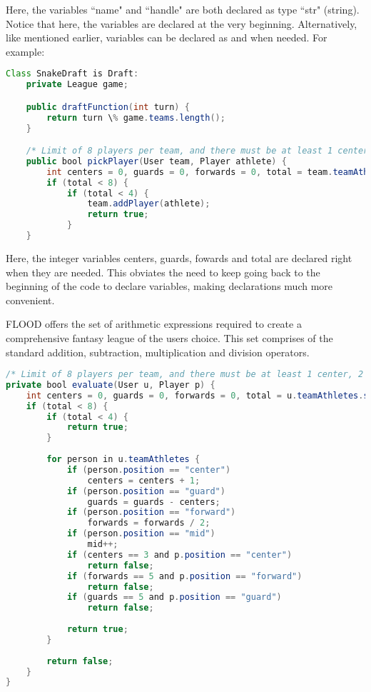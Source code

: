 \documentclass[12pt]{report}
\begin{document}
\begin{doublespace}
Here, the variables ``name" and ``handle" are both declared as type ``str" (string). Notice that here, the variables are declared at the very beginning.  Alternatively, like mentioned earlier, variables can be declared as and when needed. For example:
\end{doublespace}

\begin{lstlisting}[language=Java,label=some-code,caption=SnakeDraft.fld]
Class SnakeDraft is Draft:
	private League game;

	public draftFunction(int turn) {
		return turn \% game.teams.length();
	}

	/* Limit of 8 players per team, and there must be at least 1 center, 2 guards and 2 forwards per team. */
	public bool pickPlayer(User team, Player athlete) {
		int centers = 0, guards = 0, forwards = 0, total = team.teamAthletes.size();
		if (total < 8) {
			if (total < 4) {
				team.addPlayer(athlete);
				return true;
			}
	}
\end{lstlisting}

\begin{doublespace}
Here, the integer variables centers, guards, fowards and total are declared right when they are needed. This obviates the need to keep going back to the beginning of the code to declare variables, making declarations much more convenient.

FLOOD offers the set of arithmetic expressions required to create a comprehensive fantasy league of the users choice. This set comprises of the standard  addition, subtraction, multiplication and division operators. 
\end{doublespace}

\begin{lstlisting}[language=Java,label=some-code,caption=SnakeDraft.fld]
/* Limit of 8 players per team, and there must be at least 1 center, 2 guards and 2 forwards per team. */
private bool evaluate(User u, Player p) {
	int centers = 0, guards = 0, forwards = 0, total = u.teamAthletes.size();
	if (total < 8) {
		if (total < 4) {
			return true;
		}
		
		for person in u.teamAthletes {
			if (person.position == "center")
				centers = centers + 1;
			if (person.position == "guard")
				guards = guards - centers;
			if (person.position == "forward")
				forwards = forwards / 2;
			if (person.position == "mid")
				mid++;
			if (centers == 3 and p.position == "center")
				return false;
			if (forwards == 5 and p.position == "forward")
				return false;
			if (guards == 5 and p.position == "guard")
				return false;
		
			return true;
		}
	
		return false;
	}
}
\end{lstlisting}
\end{document}
